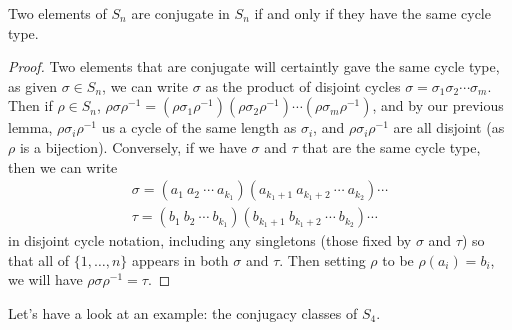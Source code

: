 \documentclass[a4]{scrreprt}
\begin{document}
\begin{proposition}
	Two elements of $S_n$ are conjugate in $S_n$ if and only if they have the same cycle type.
\end{proposition}
\begin{proof}
	Two elements that are conjugate will certaintly gave the same cycle type, as given
	$\sigma \in S_n$, we can write $\sigma$ as the product of disjoint cycles $\sigma = \sigma_1 \sigma_2 \cdots \sigma_m$. Then if $\rho \in S_n$, $\rho \sigma \rho^{-1} = (\rho \sigma_1 \rho^{-1}) (\rho \sigma_2 \rho^{-1}) \cdots  (\rho \sigma_m \rho^{-1})$, and by our previous lemma, $\rho \sigma_i \rho^{-1}$ us a cycle of the same length as $\sigma_i$, and $\rho \sigma_i \rho^{-1}$ are all disjoint (as $\rho$ is a bijection).
	Conversely, if we have $\sigma$ and $\tau$ that are the same cycle type, then we can write
	\begin{align*}
		\sigma = (a_1\ a_2\ \cdots\ a_{k_1})(a_{k_1 + 1}\ a_{k_1 + 2}\ \cdots\ a_{k_2}) \cdots \\
		\tau = (b_1\ b_2\ \cdots\ b_{k_1})(b_{k_1 + 1}\ b_{k_1 + 2}\ \cdots\ b_{k_2}) \cdots
	\end{align*}
	in disjoint cycle notation, including any singletons (those fixed by $\sigma$ and $\tau$) so that all of $\{1, \dots, n\}$ appears in both $\sigma$ and $\tau$. Then setting $\rho$
 to be $\rho(a_i) = b_i$, we will have $\rho \sigma \rho^{-1} = \tau$.
\end{proof}

Let's have a look at an example: the conjugacy classes of $S_4$.
\end{document}
